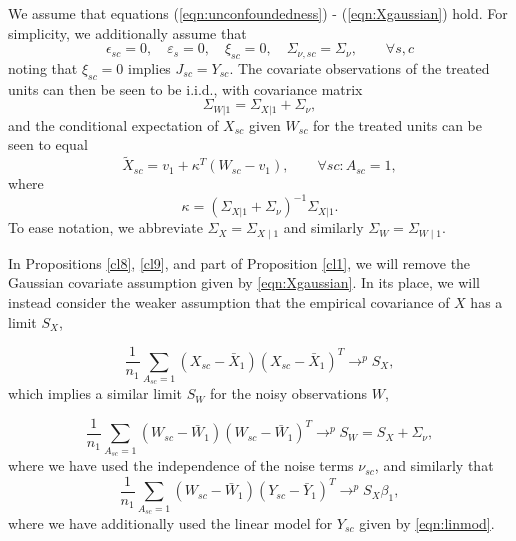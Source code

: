 We assume that equations (\ref{eqn:unconfoundedness}) - (\ref{eqn:Xgaussian}) hold. For simplicity, we additionally assume that
\begin{equation}\label{eqn:simplifications}
\epsilon_{sc} = 0, \quad \varepsilon_s = 0,\quad \xi_{sc} = 0,\quad  \Sigma_{\nu,sc} = \Sigma_\nu, \qquad \forall s,c
\end{equation}
noting that $\xi_{sc}=0$ implies $J_{sc} = Y_{sc}$. The covariate observations of the treated units can then be seen to be i.i.d., with covariance matrix
\[ \Sigma_{W|1} = \Sigma_{X|1} + \Sigma_\nu,\]
and the conditional expectation of $X_{sc}$ given $W_{sc}$ for the treated units can be seen to equal
\[ \tilde{X}_{sc} = v_1 + \kappa^T (W_{sc} - v_1), \qquad \forall sc: A_{sc}=1,\]
where
\[ \kappa = (\Sigma_{X|1} + \Sigma_{\nu})^{-1} \Sigma_{X|1}.\]
To ease notation, we abbreviate $\Sigma_X = \Sigma_{X \mid 1}$ and similarly $ \Sigma_W = \Sigma_{W \mid 1}$. 

In Propositions \ref{cl8}, \ref{cl9}, and part of Proposition \ref{cl1}, we will remove the Gaussian covariate assumption given by \eqref{eqn:Xgaussian}. In its place, we will instead consider the weaker assumption that the empirical covariance of $X$ has a limit $S_X$,

\begin{equation}\label{eqn:limitX}
 \frac{1}{n_1} \sum_{A_{sc}=1} (X_{sc} - \bar{X}_1)(X_{sc} - \bar{X}_1)^T \rightarrow^p S_X,
\end{equation}
which implies a similar limit $S_W$ for the noisy observations $W$,

\begin{equation}\label{eqn:limitW}
 \frac{1}{n_1} \sum_{A_{sc}=1} (W_{sc} - \bar{W}_1)(W_{sc} - \bar{W}_1)^T \rightarrow^p S_W = S_X + \Sigma_{\nu},
\end{equation}
where we have used the independence of the noise terms $\nu_{sc}$, and similarly that 
\begin{equation}\label{eqn:limitWY}
 \frac{1}{n_1} \sum_{A_{sc}=1} (W_{sc} - \bar{W}_1)(Y_{sc} - \bar{Y}_1)^T \rightarrow^p S_X \beta_1,
\end{equation}
where we have additionally used the linear model for $Y_{sc}$ given by \eqref{eqn:linmod}.


